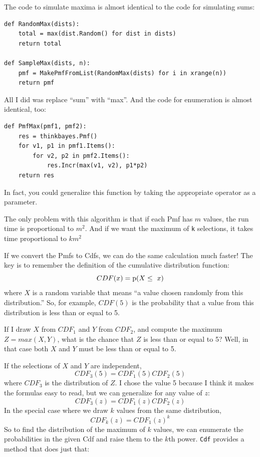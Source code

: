 \documentclass[12pt]{book}
\begin{document}
The code to simulate maxima is almost identical to the code for
simulating sums:

\begin{verbatim}
def RandomMax(dists):
    total = max(dist.Random() for dist in dists)
    return total

def SampleMax(dists, n):
    pmf = MakePmfFromList(RandomMax(dists) for i in xrange(n))
    return pmf
\end{verbatim}

All I did was replace ``sum'' with ``max''.  And the code
for enumeration is almost identical, too:

\begin{verbatim}
def PmfMax(pmf1, pmf2):
    res = thinkbayes.Pmf()
    for v1, p1 in pmf1.Items():
        for v2, p2 in pmf2.Items():
            res.Incr(max(v1, v2), p1*p2)
    return res
\end{verbatim}

In fact, you could generalize this function by taking the
appropriate operator as a parameter.

The only problem with this algorithm is that if each Pmf
has $m$ values, the run time is proportional to $m^2$.
And if we want the maximum of {\tt k} selections, it takes
time proportional to $k m^2$

If we convert the Pmfs to Cdfs, we can do the same calculation
much faster!  The key is to remember the definition of the
cumulative distribution function:
%
\[ CDF(x) = \mathrm{p}(X \le~x) \]
%
where $X$ is a random variable that means ``a value chosen
randomly from this distribution.''  So, for example, $CDF(5)$
is the probability that a value from this distribution is less
than or equal to 5.

If I draw $X$ from $CDF_1$ and $Y$ from $CDF_2$, and compute
the maximum $Z = max(X, Y)$, what is the chance that $Z$ is
less than or equal to 5?  Well, in that case both $X$ and $Y$
must be less than or equal to 5.

If the selections of $X$ and $Y$ are independent,
%
\[ CDF_3(5) = CDF_1(5) CDF_2(5) \] 
%
where $CDF_3$ is the distribution of $Z$.  I chose the value
5 because I think it makes the formulas easy to read, but we
can generalize for any value of $z$:
%
\[ CDF_3(z) = CDF_1(z) CDF_2(z) \]
%
In the special case where we draw $k$ values from the same
distribution, 
%
\[ CDF_k(z) = CDF_1(z)^k \]
%
So to find the distribution of the maximum of $k$ values,
we can enumerate the probabilities in the given Cdf
and raise them to the $k$th power.
\verb"Cdf" provides a method that does just that:
\end{document}
